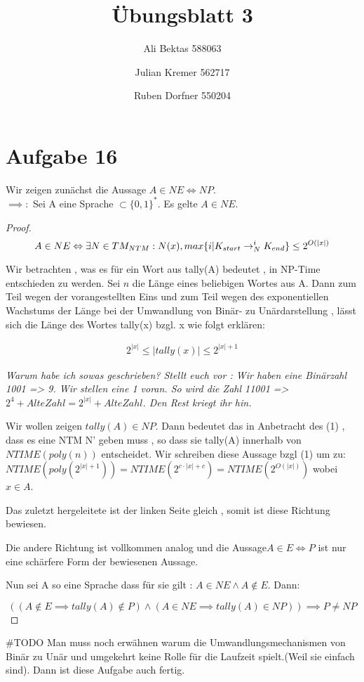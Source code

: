 \documentclass{article}
\title{Übungsblatt 3}
\author{Ali Bektas 588063 \and Julian Kremer 562717 \and Ruben Dorfner 550204}
\begin{document}
\maketitle

\section*{Aufgabe 16}
\vspace{10px}

Wir zeigen zunächst die Aussage $A \in NE \Leftrightarrow NP$.\\
$\implies :$
Sei A eine Sprache  $ \subset \{0,1\}^*$. Es gelte $A \in NE$.

\begin{proof}

\[ A \in NE  \Leftrightarrow \exists N \in TM_{NTM} : N(x) , max\{ i | K_{start} \rightarrow^i_N K_{end}\}  \leq 2^{O(|x|)} \\
\]

Wir betrachten , 
was es für ein Wort aus tally(A) bedeutet , in NP-Time entschieden zu werden. 
Sei $n$ die Länge eines beliebigen Wortes aus  A. Dann zum Teil wegen der vorangestellten Eins und zum Teil wegen des exponentiellen Wachstums der Länge bei der Umwandlung von Binär- zu Unärdarstellung , lässt sich die Länge des Wortes tally(x) bzgl. x wie folgt erklären:

\begin{align}
2^{|x|} \leq |tally(x)| \leq 2^{|x|+1}
\end{align}

\vspace{30px}
\textit{ Warum habe ich sowas geschrieben? Stellt euch vor : Wir haben eine Binärzahl 1001 => 9. Wir stellen eine 1 voran. So wird die Zahl 11001 => $2^4 + Alte Zahl = 2^|x| + Alte Zahl $. Den Rest kriegt ihr hin.}
\vspace{30px}


Wir wollen zeigen $ tally(A) \in NP $.  Dann bedeutet das in Anbetracht des (1) , dass es eine NTM N' geben muss , so dass sie tally(A) innerhalb von $NTIME(poly(n))$ entscheidet. Wir schreiben diese Aussage bzgl (1) um zu: $NTIME(poly(2^{|x| +1})) = NTIME(2^{c\cdot|x|+c}) = NTIME(2^{O(|x|)})$ wobei $x \in A$.

Das zuletzt hergeleitete ist der linken Seite gleich , somit ist diese Richtung bewiesen.

Die andere Richtung ist vollkommen analog und die Aussage$A \in E \Leftrightarrow P$ ist nur eine schärfere Form der bewiesenen Aussage.

Nun sei A so eine Sprache dass für sie gilt : $A \in NE  \land  A\notin  E$. Dann:

\[ ( (A \notin E \implies tally(A) \notin P) \land (A \in NE \implies tally(A) \in NP) ) \implies P \neq NP \] 

\end{proof}

\#TODO
Man muss noch erwähnen warum die Umwandlungsmechanismen von Binär zu Unär und umgekehrt keine Rolle für die Laufzeit spielt.(Weil sie einfach sind). Dann ist diese Aufgabe auch fertig.
\end{document}
